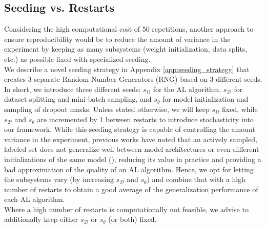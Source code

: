 \documentclass[]{article}
\begin{document}
\subsection{Seeding vs. Restarts}\label{sec:reproducibility}
Considering the high computational cost of 50 repetitions, another approach to ensure reproducibility would be to reduce the amount of variance in the experiment by keeping as many subsystems (weight initialization, data splits, etc.) as possible fixed with specialized seeding. \\
We describe a novel seeding strategy in Appendix \ref{app:seeding_strategy} that creates 3 separate Random Number Generators (RNG) based on 3 different seeds.
In short, we introduce three different seeds: $s_\Omega$ for the AL algorithm, $s_\mathcal{D}$ for dataset splitting and mini-batch sampling, and $s_\theta$ for model initialization and sampling of dropout masks.
Unless stated otherwise, we will keep $s_\Omega$ fixed, while $s_\mathcal{D}$ and $s_\theta$ are incremented by 1 between restarts to introduce stochasticity into our framework.
While this seeding strategy is capable of controlling the amount variance in the experiment, previous works have noted that an actively sampled, labeled set does not generalize well between model architectures or even different initializations of the same model (\cite{zhou2021towards, lowell2018practical}), reducing its value in practice and providing a bad approximation of the quality of an AL algorithm.
Hence, we opt for letting the subsystems vary (by increasing $s_\mathcal{D}$ and $s_\theta$) and combine that with a high number of restarts to obtain a good average of the generalization performance of each AL algorithm. \\
Where a high number of restarts is computationally not feasible, we advise to additionally keep either $s_\mathcal{D}$ or $s_\theta$ (or both) fixed.


\end{document}
